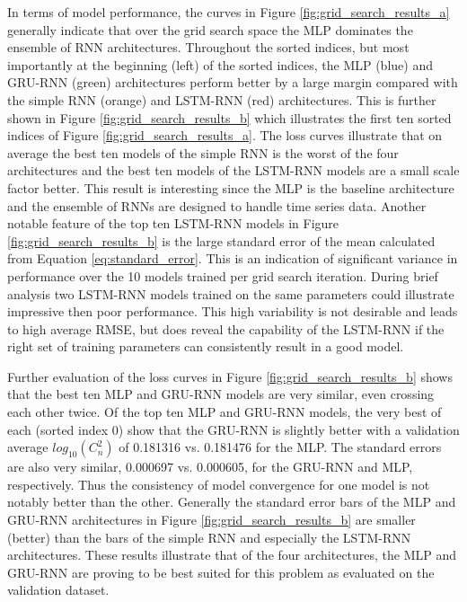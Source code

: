 In terms of model performance, the curves in Figure \ref{fig:grid_search_results_a} generally indicate that over the grid search space the \ac{MLP} dominates the ensemble of \ac{RNN} architectures. Throughout the sorted indices, but most importantly at the beginning (left) of the sorted indices, the \ac{MLP} (blue) and \ac{GRU-RNN} (green) architectures perform better by a large margin compared with the simple \ac{RNN} (orange) and \ac{LSTM-RNN} (red) architectures. This is further shown in Figure \ref{fig:grid_search_results_b} which illustrates the first ten sorted indices of Figure \ref{fig:grid_search_results_a}. The loss curves illustrate that on average the best ten models of the simple \ac{RNN} is the worst of the four architectures and the best ten models of the \ac{LSTM-RNN} models are a small scale factor better. This result is interesting since the \ac{MLP} is the baseline architecture and the ensemble of \ac{RNN}s are designed to handle time series data. Another notable feature of the top ten \ac{LSTM-RNN} models in Figure \ref{fig:grid_search_results_b} is the large standard error of the mean calculated from Equation \ref{eq:standard_error}. This is an indication of significant variance in performance over the 10 models trained per grid search iteration. During brief analysis two \ac{LSTM-RNN} models trained on the same parameters could illustrate impressive then poor performance. This high variability is not desirable and leads to high average RMSE, but does reveal the capability of the \ac{LSTM-RNN} if the right set of training parameters can consistently result in a good model.

Further evaluation of the loss curves in Figure \ref{fig:grid_search_results_b} shows that the best ten \ac{MLP} and \ac{GRU-RNN} models are very similar, even crossing each other twice. Of the top ten \ac{MLP} and \ac{GRU-RNN} models, the very best of each (sorted index 0) show that the \ac{GRU-RNN} is slightly better with a validation average $log_{10}(C_{n}^{2})$ of 0.181316 vs. 0.181476 for the \ac{MLP}. The standard errors are also very similar, 0.000697 vs. 0.000605, for the \ac{GRU-RNN} and \ac{MLP}, respectively. Thus the consistency of model convergence for one model is not notably better than the other. Generally the standard error bars of the \ac{MLP} and \ac{GRU-RNN} architectures in Figure \ref{fig:grid_search_results_b} are smaller (better) than the bars of the simple \ac{RNN} and especially the \ac{LSTM-RNN} architectures. These results illustrate that of the four architectures, the \ac{MLP} and \ac{GRU-RNN} are proving to be best suited for this problem as evaluated on the validation dataset.


